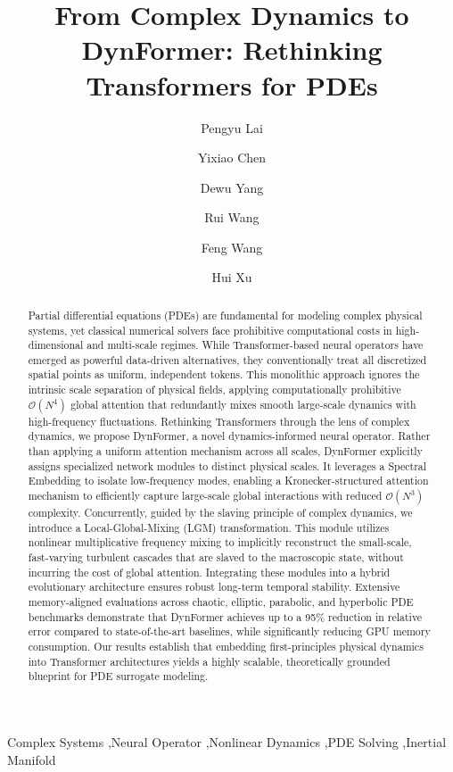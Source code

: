 \documentclass[final,3p,times]{elsarticle}
\begin{document}

\begin{frontmatter}

\title{From Complex Dynamics to DynFormer: Rethinking Transformers for PDEs}

\author[aff1]{Pengyu Lai}
\author[aff1]{Yixiao Chen}
\author[aff1]{Dewu Yang}
\author[aff1]{Rui Wang}
\author[aff1]{Feng Wang}
\author[aff1]{Hui Xu}



\begin{abstract}
Partial differential equations (PDEs) are fundamental for modeling complex physical systems, yet classical numerical solvers face prohibitive computational costs in high-dimensional and multi-scale regimes. 
While Transformer-based neural operators have emerged as powerful data-driven alternatives, they conventionally treat all discretized spatial points as uniform, independent tokens. This monolithic approach ignores the intrinsic scale separation of physical fields, applying computationally prohibitive $\mathcal{O}(N^4)$ global attention that redundantly mixes smooth large-scale dynamics with high-frequency fluctuations. Rethinking Transformers through the lens of complex dynamics, we propose DynFormer, a novel dynamics-informed neural operator. Rather than applying a uniform attention mechanism across all scales, DynFormer explicitly assigns specialized network modules to distinct physical scales. It leverages a Spectral Embedding to isolate low-frequency modes, enabling a Kronecker-structured attention mechanism to efficiently capture large-scale global interactions with reduced $\mathcal{O}(N^3)$ complexity. Concurrently, guided by the slaving principle of complex dynamics, we introduce a Local-Global-Mixing (LGM) transformation. This module utilizes nonlinear multiplicative frequency mixing to implicitly reconstruct the small-scale, fast-varying turbulent cascades that are slaved to the macroscopic state, without incurring the cost of global attention.
Integrating these modules into a hybrid evolutionary architecture ensures robust long-term temporal stability. Extensive memory-aligned evaluations across chaotic, elliptic, parabolic, and hyperbolic PDE benchmarks demonstrate that DynFormer achieves up to a 95\% reduction in relative error compared to state-of-the-art baselines, while significantly reducing GPU memory consumption. Our results establish that embedding first-principles physical dynamics into Transformer architectures yields a highly scalable, theoretically grounded blueprint for PDE surrogate modeling.
\end{abstract}

  \begin{keyword}
    Complex Systems \sep Neural Operator \sep Nonlinear Dynamics \sep PDE Solving \sep Inertial Manifold
  \end{keyword}

\end{frontmatter}
\end{document}
